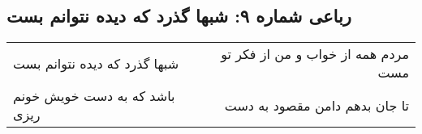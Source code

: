 \begin{center}
\section*{رباعی شماره ۹: شبها گذرد که دیده نتوانم بست}
\label{sec:009}
\begin{longtable}{l p{0.5cm} r}
شبها گذرد که دیده نتوانم بست
&&
مردم همه از خواب و من از فکر تو مست
\\
باشد که به دست خویش خونم ریزی
&&
تا جان بدهم دامن مقصود به دست
\\
\end{longtable}
\end{center}
